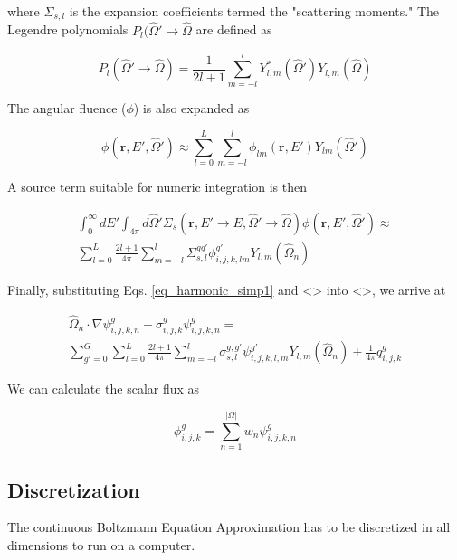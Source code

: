 \documentclass{article}
\numberwithin{equation}{subsection}
\begin{document}
where $\Sigma_{s,l}$ is the expansion coefficients termed the "scattering moments." The Legendre polynomials $P_l(\hat{\Omega}' \rightarrow \hat{\Omega}$ are defined as

\begin{equation} \label{eq_harmonic}
P_l(\hat{\Omega}' \rightarrow \hat{\Omega}) = \frac{1}{2l+1}\sum_{m=-l}^l Y_{l,m}^*(\hat{\Omega}')Y_{l,m}(\hat{\Omega})
\end{equation}

The angular fluence ($\phi$) is also expanded as

\begin{equation}
\phi(\boldsymbol{r}, E', \hat{\Omega}') \approx \sum_{l=0}^L \sum_{m=-l}^l
\phi_{lm}(\boldsymbol{r}, E')Y_{lm}(\hat{\Omega}')
\end{equation}

\noindent
A source term suitable for numeric integration is then

\begin{equation}\label{eq_harmonic_simp1}
\begin{split}
\int_0^\infty dE' \int_{4 \pi} d\hat{\Omega}' \Sigma_s(\boldsymbol{r}, E' \rightarrow E, \hat{\Omega}' \rightarrow \hat{\Omega}) \phi(\boldsymbol{r}, E', \hat{\Omega}')
\approx \\
 \sum_{l=0}^L \frac{2l+1}{4 \pi} \sum_{m=-l}^l \Sigma_{s,l}^{gg'}\phi_{i,j,k,lm}^{g'}Y_{l,m}(\hat{\Omega}_n)
\end{split}
\end{equation}

Finally, substituting Eqs. \ref{eq_harmonic_simp1} and <> into <>, we arrive at

\begin{equation}\label{eq_discretized}
\begin{split}
\hat{\Omega}_n \cdot \nabla\psi_{i,j,k,n}^g + \sigma_{i,j,k}^g \psi_{i,j,k,n}^g = \\
\sum_{g' = 0}^G \sum_{l=0}^L \frac{2l+1}{4 \pi} \sum_{m=-l}^l \sigma_{s,l}^{g,g'}\psi_{i,j,k,l,m}^{g'}Y_{l,m}(\hat{\Omega}_n) + \frac{1}{4 \pi}q_{i,j,k}^g
\end{split}
\end{equation}

We can calculate the scalar flux as

\begin{equation}
\phi_{i,j,k}^g = \sum_{n=1}^{|\Omega|} w_n \psi_{i,j,k,n}^g
\end{equation}

\subsection{Discretization}
The continuous Boltzmann Equation Approximation has to be discretized in all dimensions to run on a computer.
\end{document}
